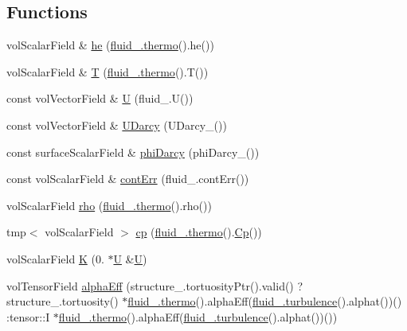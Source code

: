 \subsection*{Functions}
\begin{DoxyCompactItemize}
\item 
vol\+Scalar\+Field \& \hyperlink{EEqn__1pl_8H_aaacc8fea926e2b83e418a1ad3c1e8c43}{he} (\hyperlink{EEqns__2p_8H_a9d615e711281a88a96c648787c7dbd32}{fluid\+\_\+.\+thermo}().he())
\item 
vol\+Scalar\+Field \& \hyperlink{EEqn__1pl_8H_ad0f94aa7ea43d4be0bae24e3a89aad0c}{T} (\hyperlink{EEqns__2p_8H_a9d615e711281a88a96c648787c7dbd32}{fluid\+\_\+.\+thermo}().T())
\item 
const vol\+Vector\+Field \& \hyperlink{EEqn__1pl_8H_ab03f4990970dd7e1d06102a8dab92779}{U} (fluid\+\_\+.\+U())
\item 
const vol\+Vector\+Field \& \hyperlink{EEqn__1pl_8H_aa74123499535bb2c0f8f735346746ab2}{U\+Darcy} (U\+Darcy\+\_\+())
\item 
const surface\+Scalar\+Field \& \hyperlink{EEqn__1pl_8H_ae65fbc27d13b14a324c7621056a1c2e5}{phi\+Darcy} (phi\+Darcy\+\_\+())
\item 
const vol\+Scalar\+Field \& \hyperlink{EEqn__1pl_8H_ac772c4e2535e2242a1e052c268cb9c19}{cont\+Err} (fluid\+\_\+.\+cont\+Err())
\item 
vol\+Scalar\+Field \hyperlink{EEqn__1pl_8H_ac955f87ac2b79f02f420cae087fc52b1}{rho} (\hyperlink{EEqns__2p_8H_a9d615e711281a88a96c648787c7dbd32}{fluid\+\_\+.\+thermo}().rho())
\item 
tmp$<$ vol\+Scalar\+Field $>$ \hyperlink{EEqn__1pl_8H_a582151b02134a25fd5670374fb1ab665}{cp} (\hyperlink{EEqns__2p_8H_a9d615e711281a88a96c648787c7dbd32}{fluid\+\_\+.\+thermo}().\hyperlink{EEqns__2p_8H_a22e809ffe40f4576f41f9d568f210983}{Cp}())
\item 
vol\+Scalar\+Field \hyperlink{EEqn__1pl_8H_a0bf7c6d3f8200774cfd62534a837b61d}{K} (0. $\ast$\hyperlink{UEqn__1pl_8H_abe23fa3afe09cc511569a7dca4160561}{U} \&\hyperlink{UEqn__1pl_8H_abe23fa3afe09cc511569a7dca4160561}{U})
\item 
vol\+Tensor\+Field \hyperlink{EEqn__1pl_8H_a38742d7dee2b92bbd408c844c42eeab8}{alpha\+Eff} (structure\+\_\+.\+tortuosity\+Ptr().valid() ? structure\+\_\+.\+tortuosity() $\ast$\hyperlink{EEqns__2p_8H_a9d615e711281a88a96c648787c7dbd32}{fluid\+\_\+.\+thermo}().alpha\+Eff(\hyperlink{UEqns__2p_8H_a1769aacd25eec8e30f213b1c177e12d6}{fluid\+\_\+.\+turbulence}().alphat())() \+:tensor\+::I $\ast$\hyperlink{EEqns__2p_8H_a9d615e711281a88a96c648787c7dbd32}{fluid\+\_\+.\+thermo}().alpha\+Eff(\hyperlink{UEqns__2p_8H_a1769aacd25eec8e30f213b1c177e12d6}{fluid\+\_\+.\+turbulence}().alphat())())

\end{DoxyCompactItemize}
